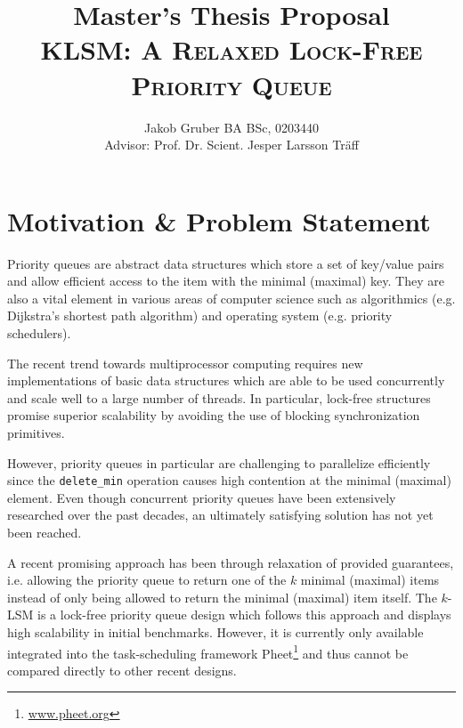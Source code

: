 \documentclass[a4paper,10pt]{article}
\title{Master's Thesis Proposal \\
       \textsc{KLSM: A Relaxed Lock-Free Priority Queue}}
\author{Jakob Gruber BA BSc, 0203440 \\
        Advisor: Prof. Dr. Scient. Jesper Larsson Tr\"aff}
\begin{document}
\maketitle

\begin{comment}
http://www.informatik.tuwien.ac.at/dekanat/abschluss-master

Der Anmeldung der Diplomarbeit ist ein Abstract beizufügen. Das Abstract muss strukturiert in
i) Problemstellung,
ii) erwartetes Resultat,
iii) methodisches Vorgehen,
iv) State-of-the art (inkl. mind. vier Literaturreferenzen) sowie
v) Bezug zum angeführten Studium
abgefasst werden.

Bsp 1: http://www.informatik.tuwien.ac.at/dekanat/Abstract1.pdf
Bsp 2: http://www.informatik.tuwien.ac.at/dekanat/Abstract2.pdf
\end{comment}

\section{Motivation \& Problem Statement}

Priority queues are abstract data structures which store a set of key/value
pairs and allow efficient access to the item with the minimal (maximal) key.
They are also a vital element in various areas of computer science such as
algorithmics (e.g. Dijkstra's shortest path algorithm) and operating system
(e.g. priority schedulers).

The recent trend towards multiprocessor computing requires new implementations
of basic data structures which are able to be used concurrently and scale well
to a large number of threads. In particular, lock-free structures promise
superior scalability by avoiding the use of blocking synchronization
primitives.

However, priority queues in particular are challenging to parallelize
efficiently since the \lstinline|delete_min| operation causes high contention
at the minimal (maximal) element.  Even though concurrent priority queues have
been extensively researched over the past decades, an ultimately satisfying
solution has
not yet been reached.

A recent promising approach has been through relaxation of provided guarantees,
i.e.  allowing the priority queue to return one of the $k$ minimal (maximal) items
instead of only being allowed to return the minimal (maximal) item itself. The $k$-LSM is
a lock-free priority queue design which follows this approach and displays high
scalability in initial benchmarks. However, it is currently only available
integrated into the task-scheduling framework
Pheet\footnote{\url{www.pheet.org}} and thus cannot be compared directly to
other recent designs.
\end{document}
